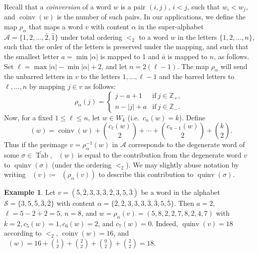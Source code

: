 \documentclass[11pt]{article}
\theoremstyle{definition}
\newtheorem{example}[theo]{Example}
\numberwithin{equation}{section}
\DeclareMathOperator{\PQT}{Tab}
\DeclareMathOperator{\coinv}{coinv}
\DeclareMathOperator{\quinvL}{\quinv^{(\ell)}}
\DeclareMathOperator{\quinv}{quinv}
\begin{document}
Recall that a {\em coinversion} of a word $w$ is a pair $(i,j)$, $i < j$, such that $w_i < w_j$, and $\coinv(w)$ is the number of such pairs. In our applications, we define the map $\rho_{\alpha}$ that maps a word $v$ with content $\alpha$ in the super-alphabet $\mathcal{A}=\{1,2,\ldots,\bar{2},\bar{1}\}$ under total ordering $<_2$ to a word $w$ in the letters $\{1,2,\ldots,n\}$, such that the order of the letters is preserved under the mapping, and such that the smallest letter $a=\min |\alpha|$ is mapped to 1 and $\bar{a}$ is mapped to $n$, as follows. Set $\ell=\max |\alpha|-\min |\alpha|+2$, and let $n=2(\ell-1)$. The map $\rho_{\alpha}$ will send the unbarred letters in $v$ to the letters $1,\ldots,\ell-1$ and the barred letters to $\ell, \dots, n$ by mapping $j \in v$ as follows: 
\[
\rho_{\alpha}(j)= \begin{cases}
j-a + 1 & \mbox{if}\ j\in\mathbb{Z}_+,\\
n-|j|+a & \mbox{if}\ j\in\mathbb{Z}_-.
\end{cases}
\] 
Now, for a fixed $1 \leq \ell \leq n$, let $w\in W_k$ (i.e.~$c_n(w)=k$). Define
\begin{equation}
\label{word-quinv-def}
\quinvL(w) = \coinv(w) + \binom{c_\ell(w)}{2} + \cdots + \binom{c_{n-1}(w)}{2} +\binom{k}{2}.
\end{equation}
Thus if the preimage $v=\rho_{\alpha}^{-1}(w)$ in $\mathcal{A}$ corresponds to the degenerate word of some $\sigma \in \widetilde{\PQT}$, $\quinvL(w)$ is equal to the contribution from the degenerate word $v$ to $\quinv(\sigma)$ (under the ordering $<_2$). We may slightly abuse notation by writing $\quinvL(v)\coloneqq 
\quinvL(\rho_{\alpha}(v))$ to describe this contribution to $\quinv(\sigma)$.

\begin{example}
Let $v=(\bar{5},\bar{2},3,3,\bar{3},\bar{2},3,5,\bar{3})$ be a word in the alphabet $\mathcal{S}=\{3,5,\bar5,\bar3,\bar2\}$ with content $\alpha=\{\bar{2},\bar{2},3,3,3,\bar{3},\bar{3},5,\bar{5}\}$. Then $a=2$, $\ell=5-2+2=5$, $n=8$, and $w=\rho_{\alpha}(v)=(5,8,2,2,7,8,2,4,7)$ with $k=2, c_5(w)=1, c_6(w)=2$, and $c_7(w)=0$. Indeed, $\quinv(v)=18$ according to $<_2$, $\coinv(w)=16$, and $\quinvL(w)=16+{1 \choose 2}+{2 \choose 2}+{0 \choose 2}+{2 \choose 2}=18$. 
\end{example}
\end{document}
